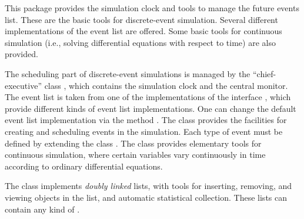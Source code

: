 \latex{\label {sec:overview}}

\begin {htmlonly}
This package provides the simulation clock and tools to manage the
future events list.  These are the basic tools for discrete-event
simulation.  Several different implementations of the event list are
offered.  Some basic tools for continuous simulation (i.e., solving
differential equations with respect to time) are also provided.
\end {htmlonly}

The scheduling part of discrete-event simulations is managed by
the ``chief-executive'' class ,
which contains the simulation clock and the central monitor.
The event list is taken from one of the implementations of the
interface ,
which provide different kinds of
event list implementations.  One can change the default
 event list 
implementation via the method
.
The class  provides the facilities
for creating and scheduling events in the simulation.
Each type of event must be defined by extending the class
.
The class 
provides elementary tools for continuous simulation,
where certain variables vary continuously in time according to ordinary
differential equations.

The class 
 implements {\em doubly linked\/} lists,
with tools for inserting, removing, and viewing objects in the list,
and automatic statistical collection.
These lists can contain any kind of .

